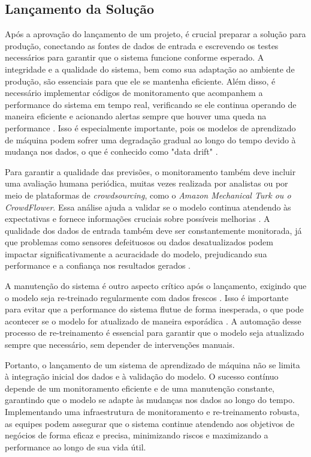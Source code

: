 \subsection{Lançamento da Solução}
Após a aprovação do lançamento de um projeto, é crucial preparar a solução para produção, conectando as fontes de dados de entrada e escrevendo os testes necessários para garantir que o sistema funcione conforme esperado. A integridade e a qualidade do sistema, bem como sua adaptação ao ambiente de produção, são essenciais para que ele se mantenha eficiente. Além disso, é necessário implementar códigos de monitoramento que acompanhem a performance do sistema em tempo real, verificando se ele continua operando de maneira eficiente e acionando alertas sempre que houver uma queda na performance \cite{geron2017}. Isso é especialmente importante, pois os modelos de aprendizado de máquina podem sofrer uma degradação gradual ao longo do tempo devido à mudança nos dados, o que é conhecido como "data drift" \cite{geron2017}.

Para garantir a qualidade das previsões, o monitoramento também deve incluir uma avaliação humana periódica, muitas vezes realizada por analistas ou por meio de plataformas de \textit{crowdsourcing}, como o \textit{Amazon Mechanical Turk ou o CrowdFlower}. Essa análise ajuda a validar se o modelo continua atendendo às expectativas e fornece informações cruciais sobre possíveis melhorias  \cite{muller2017}. A qualidade dos dados de entrada também deve ser constantemente monitorada, já que problemas como sensores defeituosos ou dados desatualizados podem impactar significativamente a acuracidade do modelo, prejudicando sua performance e a confiança nos resultados gerados  \cite{muller2017}.

A manutenção do sistema é outro aspecto crítico após o lançamento, exigindo que o modelo seja re-treinado regularmente com dados frescos \cite{geron2017}. Isso é importante para evitar que a performance do sistema flutue de forma inesperada, o que pode acontecer se o modelo for atualizado de maneira esporádica \cite{geron2017}. A automação desse processo de re-treinamento é essencial para garantir que o modelo seja atualizado sempre que necessário, sem depender de intervenções manuais. 

Portanto, o lançamento de um sistema de aprendizado de máquina não se limita à integração inicial dos dados e à validação do modelo. O sucesso contínuo depende de um monitoramento eficiente e de uma manutenção constante, garantindo que o modelo se adapte às mudanças nos dados ao longo do tempo. Implementando uma infraestrutura de monitoramento e re-treinamento robusta, as equipes podem assegurar que o sistema continue atendendo aos objetivos de negócios de forma eficaz e precisa, minimizando riscos e maximizando a performance ao longo de sua vida útil.


